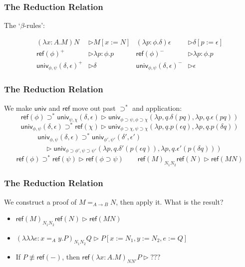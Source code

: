 \documentclass[handout]{beamer}
\newcommand{\reff}[1]{\ensuremath{\mathsf{ref} \left( {#1} \right)}}
\newcommand{\univ}[4]{\ensuremath{\mathsf{univ}_{{#1} , {#2}} \left( {#3} , {#4} \right)}}
\newcommand{\triplelambda}{\ensuremath{\lambda \!\! \lambda \!\! \lambda}}
\begin{document}
\begin{frame}[fragile]
\frametitle{The Reduction Relation}
The `$\beta$-rules':

\begin{align*}
(\lambda x:A.M)N & \rhd M[x:=N] & (\lambda p:\phi.\delta)\epsilon & \rhd \delta[p:=\epsilon] \\
 \reff{\phi}^+ & \rhd \lambda p:\phi.p & \reff{\phi}^- & \rhd \lambda p:\phi.p \\
\univ{\phi}{\psi}{\delta}{\epsilon}^+ & \rhd \delta & \univ{\phi}{\psi}{\delta}{\epsilon}^- & \rhd \epsilon
\end{align*}
\end{frame}

\begin{frame}[fragile]
\frametitle{The Reduction Relation}
We make $\mathsf{univ}$ and $\mathsf{ref}$ move out past $\supset^*$ and application:
$$\reff \phi \supset^* \univ{\psi}{\chi}{\delta}{\epsilon}
\rhd \mathsf{univ}_{\phi \supset \psi,\phi \supset \chi}(\lambda p, q . \delta (p q), \lambda p, q . \epsilon (p q))$$
$$\univ{\phi}{\psi}{\delta}{\epsilon} \supset^* \reff{\chi}
\rhd \univ{\phi \supset \chi}{\psi \supset \chi}{\lambda p,q .p (\epsilon q)}{\lambda p,q .p (\delta q)}$$
\begin{gather*}
\univ{\phi}{\psi}{\delta}{\epsilon} \supset^* \univ{\phi'}{\psi'}{\delta'}{\epsilon'} \\
\quad \rhd \univ{\phi \supset \phi'}{\psi \supset \psi'}
{\lambda p,q . \delta' (p (\epsilon q))}{\lambda p, q . \epsilon' (p (\delta q))}
\end{gather*}
$$\reff{\phi} \supset^* \reff{\psi} \rhd \reff{\phi \supset \psi}
\qquad
\reff{M}_{N_1N_2} \reff{N} \rhd \reff{MN}$$
\end{frame}

\begin{frame}[fragile]
\frametitle{The Reduction Relation}
We construct a proof of $M =_{A \rightarrow B} N$, then apply it.  What is the result?
\begin{itemize}[<+->]
\item
$\reff{M}_{N_1N_2} \reff{N} \rhd \reff{MN}$
\item
$(\triplelambda e:x =_A y. P)_{N_1N_2}Q \rhd P[x:=N_1, y:=N_2, e:=Q]$
\item
If $P \not\equiv \reff{-}$, then $\reff{\lambda x:A.M}_{NN'} P \rhd ???$
\end{itemize}

\end{frame}
\end{document}
